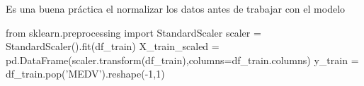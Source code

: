 \documentclass[11pt]{article}
\newenvironment{Shaded}{}{}
\newcommand{\DecValTok}[1]{\textcolor[rgb]{0.25,0.63,0.44}{{#1}}}
\newcommand{\StringTok}[1]{\textcolor[rgb]{0.25,0.44,0.63}{{#1}}}
\newcommand{\NormalTok}[1]{{#1}}
\newcommand{\ImportTok}[1]{{#1}}
\newcommand{\OperatorTok}[1]{\textcolor[rgb]{0.40,0.40,0.40}{{#1}}}
\begin{document}
Es una buena práctica el normalizar los datos antes de trabajar con el
modelo

\begin{Shaded}
\begin{Highlighting}[]
\ImportTok{from}\NormalTok{ sklearn.preprocessing }\ImportTok{import}\NormalTok{ StandardScaler}
\NormalTok{scaler }\OperatorTok{=}\NormalTok{ StandardScaler().fit(df_train)}
\NormalTok{X_train_scaled }\OperatorTok{=}\NormalTok{ pd.DataFrame(scaler.transform(df_train),columns}\OperatorTok{=}\NormalTok{df_train.columns)}
\NormalTok{y_train }\OperatorTok{=}\NormalTok{ df_train.pop(}\StringTok{'MEDV'}\NormalTok{).reshape(}\OperatorTok{-}\DecValTok{1}\NormalTok{,}\DecValTok{1}\NormalTok{)}
\end{Highlighting}
\end{Shaded}
\end{document}
